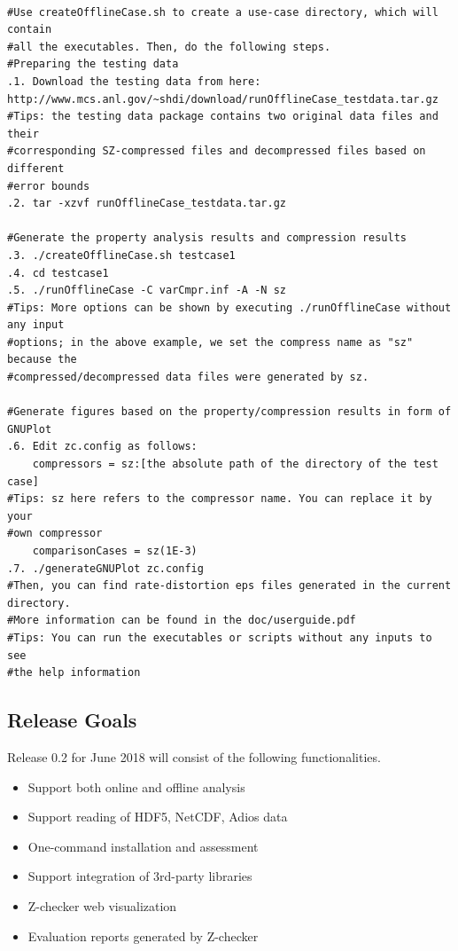 \begin{lstlisting}[style=ShellStyleInline, basicstyle =\footnotesize\ttfamily]

#Use createOfflineCase.sh to create a use-case directory, which will contain
#all the executables. Then, do the following steps.
#Preparing the testing data
.1. Download the testing data from here:
http://www.mcs.anl.gov/~shdi/download/runOfflineCase_testdata.tar.gz
#Tips: the testing data package contains two original data files and their
#corresponding SZ-compressed files and decompressed files based on different
#error bounds
.2. tar -xzvf runOfflineCase_testdata.tar.gz

#Generate the property analysis results and compression results
.3. ./createOfflineCase.sh testcase1
.4. cd testcase1
.5. ./runOfflineCase -C varCmpr.inf -A -N sz
#Tips: More options can be shown by executing ./runOfflineCase without any input
#options; in the above example, we set the compress name as "sz" because the
#compressed/decompressed data files were generated by sz.

#Generate figures based on the property/compression results in form of GNUPlot
.6. Edit zc.config as follows:
    compressors = sz:[the absolute path of the directory of the test case]
#Tips: sz here refers to the compressor name. You can replace it by your
#own compressor
    comparisonCases = sz(1E-3)
.7. ./generateGNUPlot zc.config
#Then, you can find rate-distortion eps files generated in the current directory.
#More information can be found in the doc/userguide.pdf
#Tips: You can run the executables or scripts without any inputs to see
#the help information
\end{lstlisting}

\subsection{Release Goals}
Release 0.2 for June 2018 will consist of the following functionalities.

\begin{itemize}
  \item Support both online and offline analysis
  \item Support reading of HDF5, NetCDF, Adios data
  \item One-command installation and assessment
  \item Support integration of 3rd-party libraries
  \item Z-checker web visualization
  \item Evaluation reports generated by Z-checker
\end{itemize}
